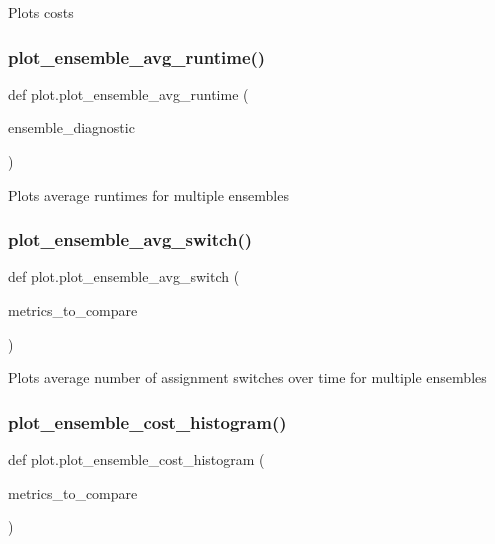 \begin{DoxyVerb}Plots costs
\end{DoxyVerb}
 \mbox{\label{namespaceplot_a5f49d0a04a95306f00e03a27d4c0cdf2}} 
\subsubsection{\texorpdfstring{plot\_ensemble\_avg\_runtime()}{plot\_ensemble\_avg\_runtime()}}
{\footnotesize\ttfamily def plot.\+plot\+\_\+ensemble\+\_\+avg\+\_\+runtime (\begin{DoxyParamCaption}\item[{}]{ensemble\+\_\+diagnostic }\end{DoxyParamCaption})}

\begin{DoxyVerb}Plots average runtimes for multiple ensembles
\end{DoxyVerb}
 \mbox{\label{namespaceplot_a27a576db25c863b2ab7d69cf99fe752a}} 
\subsubsection{\texorpdfstring{plot\_ensemble\_avg\_switch()}{plot\_ensemble\_avg\_switch()}}
{\footnotesize\ttfamily def plot.\+plot\+\_\+ensemble\+\_\+avg\+\_\+switch (\begin{DoxyParamCaption}\item[{}]{metrics\+\_\+to\+\_\+compare }\end{DoxyParamCaption})}

\begin{DoxyVerb}Plots average number of assignment switches over time for multiple ensembles
\end{DoxyVerb}
 \mbox{\label{namespaceplot_ac2c45ae26abb51de90367c1c70e32ff2}} 
\subsubsection{\texorpdfstring{plot\_ensemble\_cost\_histogram()}{plot\_ensemble\_cost\_histogram()}}
{\footnotesize\ttfamily def plot.\+plot\+\_\+ensemble\+\_\+cost\+\_\+histogram (\begin{DoxyParamCaption}\item[{}]{metrics\+\_\+to\+\_\+compare }\end{DoxyParamCaption})}

